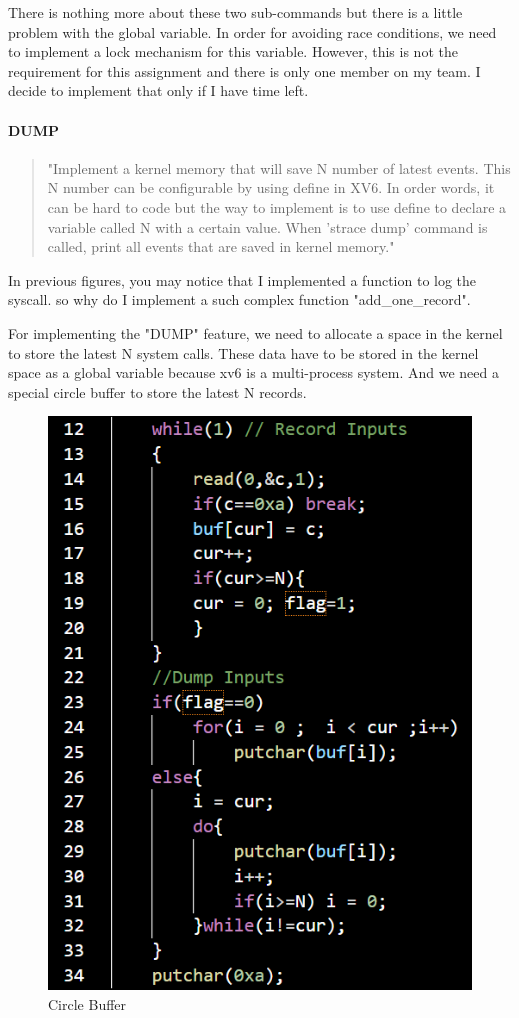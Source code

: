 \documentclass[11pt,oneside,a4paper]{article}
\begin{document}
There is nothing more about these 
two sub-commands but there is a little problem with the global variable. In order for 
avoiding race conditions, we need to implement a lock mechanism for this variable. However,
this is not the requirement for this assignment and there is only one member on my team. 
I decide to implement that only if I have time left.




\paragraph*{DUMP}
\begin{quotation}
"Implement a kernel memory that will save N number of latest events. This N number can be
configurable by using define in XV6. In order words, it can be hard to code but the way to implement
is to use define to declare a variable called N with a certain value. When 'strace dump' command is
called, print all events that are saved in kernel memory."
\end{quotation}
In previous figures, you may notice that I implemented a function to log the syscall.
so why do I implement a such complex function "add\_one\_record".

For implementing the "DUMP" feature, we need to allocate a space in the kernel to store
the latest N system calls. These data have to be stored in the kernel space as a global 
variable because xv6 is a multi-process system. And we need a special circle buffer to
store the latest N records.

\begin{figure}[H]
    \includegraphics[width=4.75in]{1-9.png}
    \centering
    \caption{Circle Buffer}
\end{figure}
\end{document}
